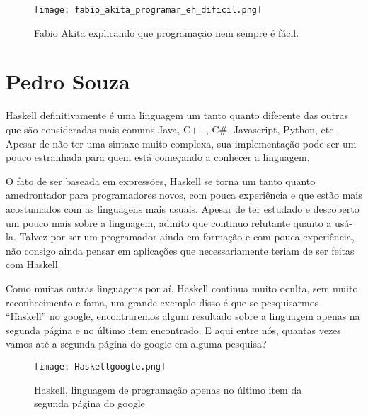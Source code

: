 \begin{apendicesenv}
    \begin{figure}[ht]
      \caption{\href{https://www.youtube.com/watch?v=V7oUDL7E1g4}{Fabio Akita explicando que programação nem sempre é fácil.}}
      \texttt{[image: fabio\_akita\_programar\_eh\_dificil.png]}
    \end{figure}

    \newpage

    \chapter{Pedro Souza}

    Haskell definitivamente é uma linguagem um tanto quanto diferente das outras que são consideradas mais comuns Java, C++, C\#, Javascript,
    Python, etc. Apesar de não ter uma sintaxe muito complexa, sua implementação pode ser um pouco estranhada para quem está começando a conhecer
    a linguagem. 

    O fato de ser baseada em expressões, Haskell se torna um tanto quanto amedrontador para programadores novos, com pouca experiência e que estão
    mais acostumados com as linguagens mais usuais. Apesar de ter estudado e descoberto um pouco mais sobre a linguagem, admito que continuo 
    relutante quanto a usá-la. Talvez por ser um programador ainda em formação e com pouca experiência, não consigo ainda pensar em aplicações 
    que necessariamente teriam de ser feitas com Haskell.

    Como muitas outras linguagens por aí, Haskell continua muito oculta, sem muito reconhecimento e fama, um grande exemplo disso é que se pesquisarmos
    ``Haskell'' no google, encontraremos algum resultado sobre a linguagem apenas na segunda página e no último item encontrado. E aqui entre nós, quantas vezes vamos
    até a segunda página do google em alguma pesquisa?

    \begin{figure}[ht]
        \centering 
        \caption{Haskell, linguagem de programação apenas no último item da segunda página do google}
        \texttt{[image: Haskellgoogle.png]}
    \end{figure}

\end{apendicesenv}
